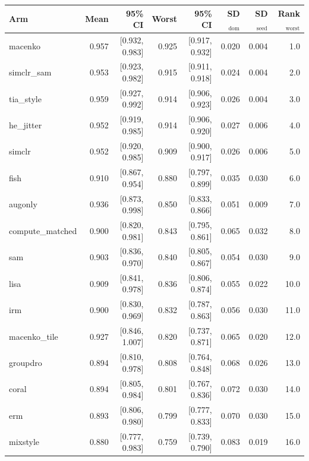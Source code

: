 \begin{tabular}{lrrrrrrr}
\toprule
Arm & Mean & 95\% CI & Worst & 95\% CI & SD$_\text{dom}$ & SD$_\text{seed}$ & Rank$_\text{worst}$ \\
\midrule
macenko & 0.957 & [0.932, 0.983] & 0.925 & [0.917, 0.932] & 0.020 & 0.004 & 1.0 \\
simclr\_sam & 0.953 & [0.923, 0.982] & 0.915 & [0.911, 0.918] & 0.024 & 0.004 & 2.0 \\
tia\_style & 0.959 & [0.927, 0.992] & 0.914 & [0.906, 0.923] & 0.026 & 0.004 & 3.0 \\
he\_jitter & 0.952 & [0.919, 0.985] & 0.914 & [0.906, 0.920] & 0.027 & 0.006 & 4.0 \\
simclr & 0.952 & [0.920, 0.985] & 0.909 & [0.900, 0.917] & 0.026 & 0.006 & 5.0 \\
fish & 0.910 & [0.867, 0.954] & 0.880 & [0.797, 0.899] & 0.035 & 0.030 & 6.0 \\
augonly & 0.936 & [0.873, 0.998] & 0.850 & [0.833, 0.866] & 0.051 & 0.009 & 7.0 \\
compute\_matched & 0.900 & [0.820, 0.981] & 0.843 & [0.795, 0.861] & 0.065 & 0.032 & 8.0 \\
sam & 0.903 & [0.836, 0.970] & 0.840 & [0.805, 0.867] & 0.054 & 0.030 & 9.0 \\
lisa & 0.909 & [0.841, 0.978] & 0.836 & [0.806, 0.874] & 0.055 & 0.022 & 10.0 \\
irm & 0.900 & [0.830, 0.969] & 0.832 & [0.787, 0.863] & 0.056 & 0.030 & 11.0 \\
macenko\_tile & 0.927 & [0.846, 1.007] & 0.820 & [0.737, 0.871] & 0.065 & 0.020 & 12.0 \\
groupdro & 0.894 & [0.810, 0.978] & 0.808 & [0.764, 0.848] & 0.068 & 0.026 & 13.0 \\
coral & 0.894 & [0.805, 0.984] & 0.801 & [0.767, 0.836] & 0.072 & 0.030 & 14.0 \\
erm & 0.893 & [0.806, 0.980] & 0.799 & [0.777, 0.833] & 0.070 & 0.030 & 15.0 \\
mixstyle & 0.880 & [0.777, 0.983] & 0.759 & [0.739, 0.790] & 0.083 & 0.019 & 16.0 \\
\bottomrule
\end{tabular}
